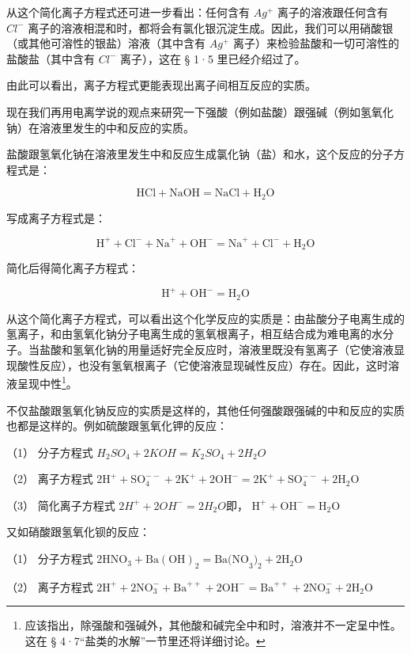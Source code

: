 从这个简化离子方程式还可进一步看出：任何含有 \(Ag^{+}\)
离子的溶液跟任何含有 \(Cl^{-}\)
离子的溶液相混和时，都将会有氯化银沉淀生成。因此，我们可以用硝酸银（或其他可溶性的银盐）溶液（其中含有
\(Ag^{+}\) 离子）来检验盐酸和一切可溶性的盐酸盐（其中含有 \(Cl^{-}\)
离子），这在 § 1·5 里已经介绍过了。

由此可以看出，离子方程式更能表现出离子间相互反应的实质。

现在我们再用电离学说的观点来研究一下强酸（例如盐酸）跟强碱（例如氢氧化钠）在溶液里发生的中和反应的实质。

盐酸跟氢氧化钠在溶液里发生中和反应生成氯化钠（盐）和水，这个反应的分子方程式是：

\[
\mathrm{HCl} + \mathrm{NaOH} = \mathrm{NaCl} + \mathrm{H} _ {2} \mathrm{O}
\]

写成离子方程式是：

\[
\mathrm{H} ^ {+} + \mathrm{Cl} ^ {-} + \mathrm{Na} ^ {+} + \mathrm{OH} ^ {-} = \mathrm{Na} ^ {+} + \mathrm{Cl} ^ {-} + \mathrm{H} _ {2} \mathrm{O}
\]

简化后得简化离子方程式：

\[
\mathrm{H} ^ {+} + \mathrm{OH} ^ {-} = \mathrm{H} _ {2} \mathrm{O}
\]

从这个简化离子方程式，可以看出这个化学反应的实质是：由盐酸分子电离生成的氢离子，和由氢氧化钠分子电离生成的氢氧根离子，相互结合成为难电离的水分子。当盐酸和氢氧化钠的用量适好完全反应时，溶液里既没有氢离子（它使溶液显现酸性反应），也没有氢氧根离子（它使溶液显现碱性反应）存在。因此，这时溶液呈现中性\footnote{应该指出，除强酸和强碱外，其他酸和碱完全中和时，溶液并不一定呈中性。这在
  § 4·7``盐类的水解''一节里还将详细讨论。}。

不仅盐酸跟氢氧化钠反应的实质是这样的，其他任何强酸跟强碱的中和反应的实质也都是这样的。例如硫酸跟氢氧化钾的反应：

（1） 分子方程式 \(H_{2}SO_{4} + 2KOH = K_{2}SO_{4} + 2H_{2}O\)

（2） 离子方程式
\(2\mathrm{H}^{+} + \mathrm{SO}_{4}^{--} + 2\mathrm{K}^{+} + 2\mathrm{OH}^{-} = 2\mathrm{K}^{+} + \mathrm{SO}_{4}^{--} + 2\mathrm{H}_{2}\mathrm{O}\)

（3） 简化离子方程式 \(2H^{+} + 2OH^{-} = 2H_{2}O\)即，
\(\mathrm{H}^{+} + \mathrm{OH}^{-} = \mathrm{H}_{2}\mathrm{O}\)

又如硝酸跟氢氧化钡的反应：

（1） 分子方程式
\(2\mathrm{HNO}_3 + \mathrm{Ba(OH)}_2 = \mathrm{Ba(NO}_3)_2 + 2\mathrm{H}_2\mathrm{O}\)

（2） 离子方程式
\(2\mathrm{H}^{+} + 2\mathrm{NO}_{3}^{-} + \mathrm{Ba}^{++} + 2\mathrm{OH}^{-} = \mathrm{Ba}^{++} + 2\mathrm{NO}_{3}^{-} + 2\mathrm{H}_{2}\mathrm{O}\)

